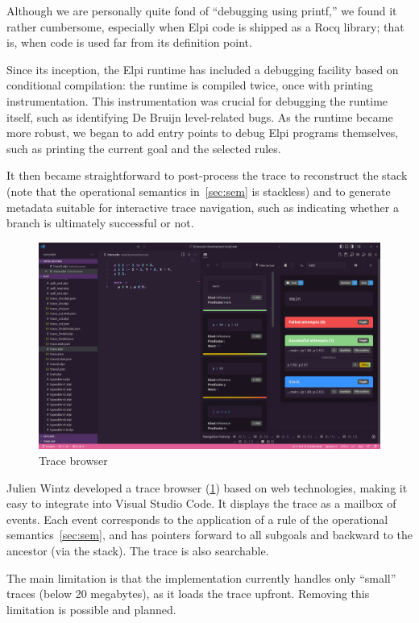 \documentclass[a4paper, 11pt]{book}
\begin{document}
Although we are personally quite fond of ``debugging using printf,'' we found
it rather cumbersome, especially when Elpi code is shipped as a Rocq library;
that is, when code is used far from its definition point.

Since its inception, the Elpi runtime has included a debugging facility based
on conditional compilation: the runtime is compiled twice, once with printing
instrumentation. This instrumentation was crucial for debugging the runtime
itself, such as identifying De Bruijn level-related bugs. As the runtime
became more robust, we began to add entry points to debug Elpi programs
themselves, such as printing the current goal and the selected rules.

It then became straightforward to post-process the trace to reconstruct the
stack (note that the operational semantics in~\cref{sec:sem} is stackless)
and to generate metadata suitable for interactive trace navigation, such as
indicating whether a branch is ultimately successful or not.

\begin{figure}
    \includegraphics[width=.9\textwidth]{elpi-tracer}
    \caption{Trace browser\label{fig:trace}}
\end{figure}

Julien Wintz developed a trace browser (\cref{fig:trace}) based on web
technologies, making it easy to integrate into Visual Studio Code. It displays
the trace as a mailbox of events. Each event corresponds to the application of
a rule of the operational semantics~\cref{sec:sem}, and has pointers forward
to all subgoals and backward to the ancestor (via the stack). The trace is
also searchable.

The main limitation is that the implementation currently handles only
``small'' traces (below 20 megabytes), as it loads the trace upfront. Removing
this limitation is possible and planned.
\end{document}
